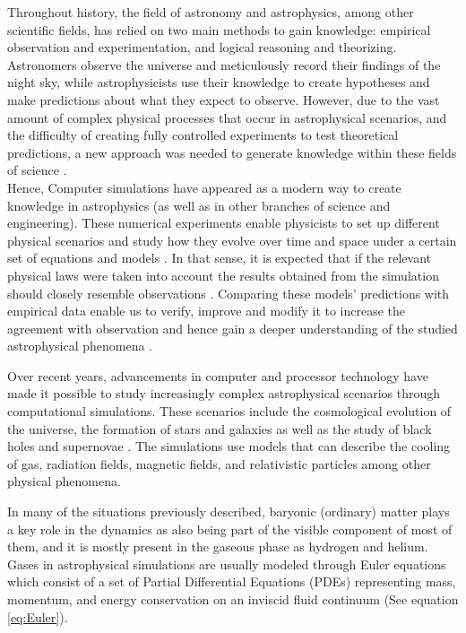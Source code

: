 Throughout history, the field of astronomy and astrophysics, among other scientific fields, has relied on two main methods to gain knowledge: empirical observation and experimentation, and logical reasoning and theorizing. Astronomers observe the universe and meticulously record their findings of the night sky, while astrophysicists use their knowledge to create hypotheses and make predictions about what they expect to observe. However, due to the vast amount of complex physical processes that occur in astrophysical scenarios, and the difficulty of creating fully controlled experiments to test theoretical predictions, a new approach was needed to generate knowledge within these fields of science \cite{Sundberg2010CulturesAstrophysics}.\\
Hence, Computer simulations have appeared as a modern way to create knowledge in astrophysics (as well as in other branches of science and engineering). These numerical experiments enable physicists to set up different physical scenarios and study how they evolve over time and space under a certain set of equations and models \cite{Sundberg2012CreatingAstrophysics}. In that sense, it is expected that if the relevant physical laws were taken into account the results obtained from the simulation should closely resemble observations \cite{Heng2014TheSimulations}. Comparing these models' predictions with empirical data enable us to verify, improve and modify it to increase the agreement with observation and hence gain a deeper understanding of the studied astrophysical phenomena \cite{Muller2005SimulatingAchievements}.

Over recent years, advancements in computer and processor technology have made it possible to study increasingly complex astrophysical scenarios through computational simulations. These scenarios include the cosmological evolution of the universe, the formation of stars and galaxies \cite{Vogelsberger2020CosmologicalFormation, Garrison-Kimmel2017NotGalaxies} as well as the study of black holes and supernovae \cite{Brown2008TurduckeningStudy, Donmez2006NumericalCode, Muller2004TowardModels}. The simulations use models that can describe the cooling of gas, radiation fields, magnetic fields, and relativistic particles among other physical phenomena.

In many of the situations previously described, baryonic (ordinary) matter plays a key role in the dynamics as also being part of the visible component of most of them, and it is mostly present in the gaseous phase as hydrogen and helium.  Gases in astrophysical simulations are usually modeled through Euler equations which consist of a set of Partial Differential Equations (PDEs) representing mass, momentum, and  energy conservation on an inviscid fluid continuum (See equation \ref{eq:Euler}). 

